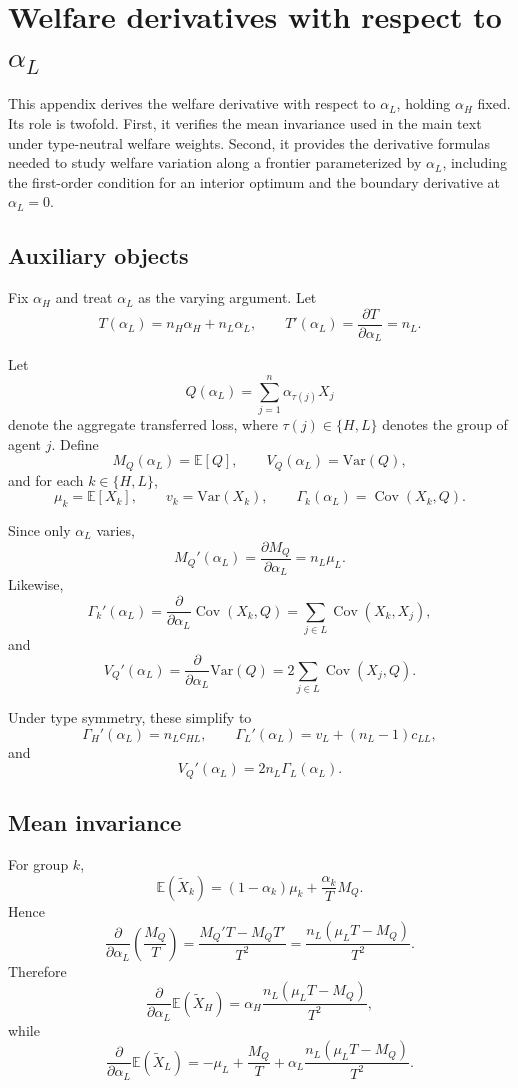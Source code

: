 \documentclass[a4paper,12pt]{article}
\theoremstyle{definition}
\theoremstyle{remark}
\DeclareMathOperator{\Cov}{Cov}
\newcommand{\E}{\mathbb{E}}
\newcommand{\Var}{\mathrm{Var}}
\newcommand{\1}{\mathbf{1}}
\begin{document}
\section{Welfare derivatives with respect to \texorpdfstring{\(\alpha_L\)}{alphaL}}
\label{app:alphaL}

This appendix derives the welfare derivative with respect to \(\alpha_L\),
holding \(\alpha_H\) fixed. Its role is twofold. First, it verifies the mean
invariance used in the main text under type-neutral welfare weights. Second, it
provides the derivative formulas needed to study welfare variation along a
frontier parameterized by \(\alpha_L\), including the first-order condition for
an interior optimum and the boundary derivative at \(\alpha_L=0\).

\subsection{Auxiliary objects}
\label{app:alphaL-objects}

Fix \(\alpha_H\) and treat \(\alpha_L\) as the varying argument. Let
\[
T(\alpha_L)=n_H\alpha_H+n_L\alpha_L,
\qquad
T'(\alpha_L)=\frac{\partial T}{\partial \alpha_L}=n_L.
\]

Let
\[
Q(\alpha_L)=\sum_{j=1}^n \alpha_{\tau(j)}X_j
\]
denote the aggregate transferred loss, where \(\tau(j)\in\{H,L\}\) denotes the
group of agent \(j\). Define
\[
M_Q(\alpha_L)=\E[Q],
\qquad
V_Q(\alpha_L)=\Var(Q),
\]
and for each \(k\in\{H,L\}\),
\[
\mu_k=\E[X_k],
\qquad
v_k=\Var(X_k),
\qquad
\Gamma_k(\alpha_L)=\Cov(X_k,Q).
\]

Since only \(\alpha_L\) varies,
\[
M_Q'(\alpha_L)=\frac{\partial M_Q}{\partial \alpha_L}=n_L\mu_L.
\]
Likewise,
\[
\Gamma_k'(\alpha_L)
=
\frac{\partial}{\partial \alpha_L}\Cov(X_k,Q)
=
\sum_{j\in L}\Cov(X_k,X_j),
\]
and
\[
V_Q'(\alpha_L)
=
\frac{\partial}{\partial \alpha_L}\Var(Q)
=
2\sum_{j\in L}\Cov(X_j,Q).
\]

Under type symmetry, these simplify to
\[
\Gamma_H'(\alpha_L)=n_L c_{HL},
\qquad
\Gamma_L'(\alpha_L)=v_L+(n_L-1)c_{LL},
\]
and
\[
V_Q'(\alpha_L)=2n_L\Gamma_L(\alpha_L).
\]

\subsection{Mean invariance}
\label{app:alphaL-mean}

For group \(k\),
\[
\E(\tilde X_k)=(1-\alpha_k)\mu_k+\frac{\alpha_k}{T}M_Q.
\]
Hence
\[
\frac{\partial}{\partial \alpha_L}\left(\frac{M_Q}{T}\right)
=
\frac{M_Q'T-M_QT'}{T^2}
=
\frac{n_L(\mu_LT-M_Q)}{T^2}.
\]
Therefore
\[
\frac{\partial}{\partial \alpha_L}\E(\tilde X_H)
=
\alpha_H\frac{n_L(\mu_LT-M_Q)}{T^2},
\]
while
\[
\frac{\partial}{\partial \alpha_L}\E(\tilde X_L)
=
-\mu_L+\frac{M_Q}{T}
+\alpha_L\frac{n_L(\mu_LT-M_Q)}{T^2}.
\]
\end{document}
